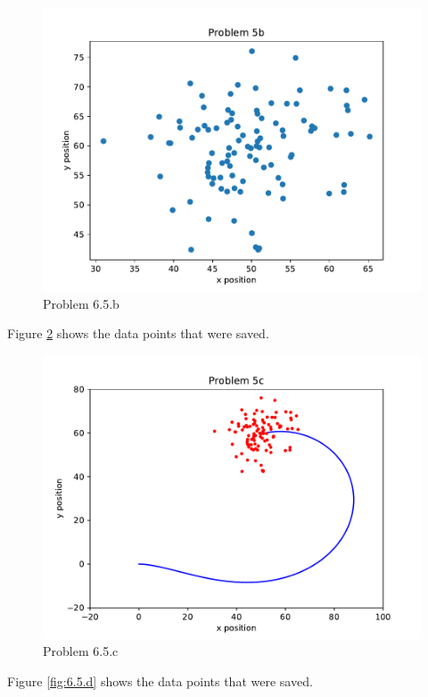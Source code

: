 \documentclass{article}
\begin{document}
\begin{figure}[h]
    \centering
    \includegraphics[pages=1]{p6-5-b}
    \caption{Problem 6.5.b}
    \label{fig:6.5.b}
\end{figure}


\newpage
Figure \ref{fig:6.5.c} shows the data points that were saved.

\begin{figure}[h]
    \centering
    \includegraphics[pages=1]{p6-5-c}
    \caption{Problem 6.5.c}
    \label{fig:6.5.c}
\end{figure}


\newpage
Figure \ref{fig:6.5.d} shows the data points that were saved.
\end{document}
